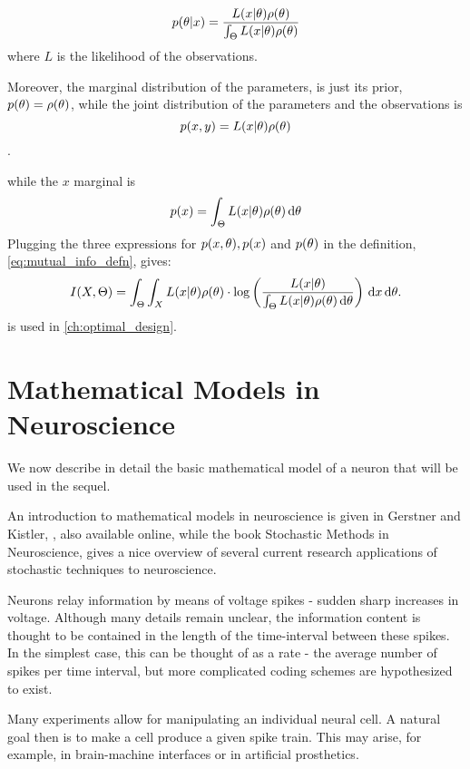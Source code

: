 \begin{equation}
p({ \theta}|x) = \frac{L(x|{ \theta})\rho({ \theta})}{\int_{\Theta} L(x|{ \theta})\rho({ \theta})}
\label{eq:bayes_formula}
\end{equation}
where $L$ is the likelihood of the observations.

Moreover, the marginal distribution of the parameters, is just its prior,
$p({ \theta}) = \rho({ \theta})$, while the joint distribution of the parameters and the
observations is $$p(x,y) = L(x|{ \theta})\rho({ \theta})$$.

while the $x$ marginal is $$p(x) = \int_\Theta L(x|{ \theta})\rho({ \theta}) \, \mathrm{d} { \theta}$$
Plugging the three expressions for $p(x,{ \theta}), p(x)$ and $p({ \theta})$ in the
definition, \cref{eq:mutual_info_defn}, gives:
\begin{equation}
I(X,{\Theta}) = \int_\Theta \int_X L(x|{ \theta})\rho({ \theta}) \cdot 
\log \left( \frac{L(x|{ \theta}) }
				{\int_\Theta L(x|{ \theta})\rho({ \theta}) \, \mathrm{d} { \theta}  } \right)
\, \mathrm{d} x\, \mathrm{d} { \theta}.
\label{eq:mutual_info_posterior_vs_observations} 
\end{equation} 
  is used in
\cref{ch:optimal_design}.




\section{Mathematical Models in Neuroscience}
\label{sec:math_models_in_neuroscience}
We now describe in detail the basic mathematical model of a neuron that will be
used in the sequel. 

An introduction to mathematical models in neuroscience is given in Gerstner and
Kistler, \cite{Gerstner2002}, also available online, while the book Stochastic
Methods in Neuroscience, \cite{Laing2009} gives a nice overview of several
current research applications of stochastic techniques to neuroscience.


Neurons relay information by means of voltage spikes - sudden sharp increases in
voltage. Although many details remain unclear, the information content is
thought to be contained in the length of the time-interval between these spikes.
In the simplest case, this can be thought of as a rate - the average number of
spikes per time interval, but more complicated coding schemes are hypothesized to
exist. 

Many experiments allow for manipulating an individual neural cell. A natural
goal then is to make a cell produce a given spike train. This may arise, for
example, in brain-machine interfaces or in artificial prosthetics. 


